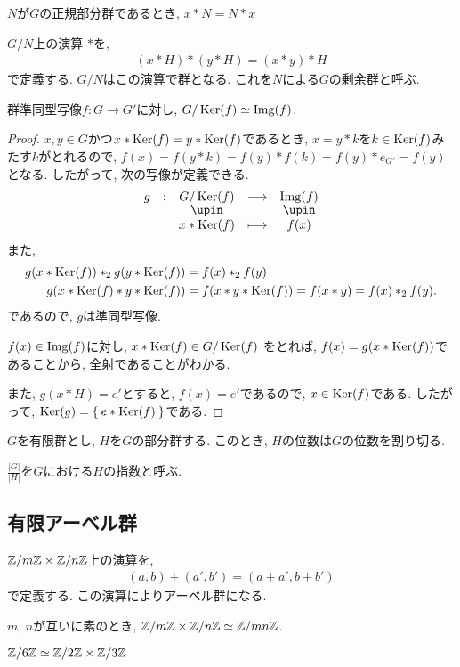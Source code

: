   \begin{lemma}
    $N$が$G$の正規部分群であるとき,
    $x\ast N = N\ast x$
  \end{lemma}

  $G/N$上の演算 $*$を,
  \begin{align*}
    (x\ast H) * (y\ast H) = (x\ast y)\ast H
  \end{align*}
  で定義する.
  $G/N$はこの演算で群となる.
  これを$N$による$G$の剰余群と呼ぶ.

  \begin{theorem}
    群準同型写像$f\colon G \to G'$に対し,
    $G/\operatorname{Ker}(f)\simeq \operatorname{Img}(f)$.
  \end{theorem}
  \begin{proof}
    $x,y\in G$かつ$x\ast \operatorname{Ker}(f)=y\ast\operatorname{Ker}(f)$であるとき,
    $x=y\ast k$を$k\in \operatorname{Ker}(f)$みたす$k$がとれるので,
    $f(x)=f(y\ast k)=f(y)\ast f(k)=f(y)\ast e_{G'}=f(y)$となる.
    したがって, 次の写像が定義できる.
    \begin{align*}
      \shazo{g}{G/\Ker(f)}{\Img(f)}{x\ast \Ker(f)}{f(x)}
    \end{align*}
    また,
    \begin{align*}
      g(x\ast \operatorname{Ker}(f))\ast_2 g(y\ast \operatorname{Ker}(f))&=f(x)\ast_2 f(y) \\
      g(x\ast \operatorname{Ker}(f) \ast y\ast \operatorname{Ker}(f))&=f(x\ast y \ast \operatorname{Ker}(f))=f(x\ast y)=f(x)\ast_2 f(y).
    \end{align*}
    であるので, $g$は準同型写像.

    $f(x)\in \operatorname{Img}(f)$に対し, $x\ast \operatorname{Ker}(f) \in G/\operatorname{Ker}(f)$
    をとれば,
    $f(x)=g(x\ast \operatorname{Ker}(f))$であることから,
    全射であることがわかる.

    また, $g(x\ast H)=e'$とすると, $f(x)=e'$であるので, $x\in \operatorname{Ker}(f)$である.
    したがって, $\operatorname{Ker}(g)=\Set{e\ast \operatorname{Ker}(f)}$である.
  \end{proof}
  \begin{theorem}
    $G$を有限群とし, $H$を$G$の部分群する.
    このとき, $H$の位数は$G$の位数を割り切る.
  \end{theorem}
  \begin{definition}
    $\frac{|G|}{|H|}$を$G$における$H$の指数と呼ぶ.
  \end{definition}


  \subsection{有限アーベル群}
  $\mathbb{Z}/m\mathbb{Z} \times \mathbb{Z}/n\mathbb{Z}$上の演算を,
  \begin{align*}
    (a,b)+(a',b') = (a+a',b+b')
  \end{align*}
  で定義する.
  この演算によりアーベル群になる.
  \begin{theorem}
    $m$, $n$が互いに素のとき, $\mathbb{Z}/m\mathbb{Z} \times \mathbb{Z}/n\mathbb{Z} \simeq \mathbb{Z}/mn\mathbb{Z}$.
  \end{theorem}
  \begin{example}
    $\mathbb{Z}/6\mathbb{Z}\simeq \mathbb{Z}/2\mathbb{Z}\times \mathbb{Z}/3\mathbb{Z}$
  \end{example}
    
